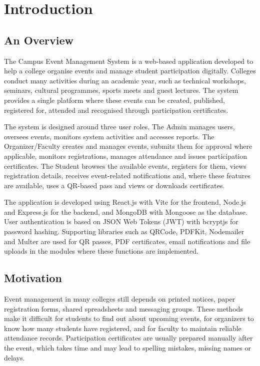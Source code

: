 \documentclass[12pt,a4paper]{report}
\begin{document}
\setcounter{page}{1}

\chapter{Introduction}

\section{An Overview}
The Campus Event Management System is a web-based application developed to help a college organise events and manage student participation digitally. Colleges conduct many activities during an academic year, such as technical workshops, seminars, cultural programmes, sports meets and guest lectures. The system provides a single platform where these events can be created, published, registered for, attended and recognised through participation certificates.

The system is designed around three user roles. The Admin manages users, oversees events, monitors system activities and accesses reports. The Organizer/Faculty creates and manages events, submits them for approval where applicable, monitors registrations, manages attendance and issues participation certificates. The Student browses the available events, registers for them, views registration details, receives event-related notifications and, where these features are available, uses a QR-based pass and views or downloads certificates.

The application is developed using React.js with Vite for the frontend, Node.js and Express.js for the backend, and MongoDB with Mongoose as the database. User authentication is based on JSON Web Tokens (JWT) with bcryptjs for password hashing. Supporting libraries such as QRCode, PDFKit, Nodemailer and Multer are used for QR passes, PDF certificates, email notifications and file uploads in the modules where these functions are implemented.

\section{Motivation}
Event management in many colleges still depends on printed notices, paper registration forms, shared spreadsheets and messaging groups. These methods make it difficult for students to find out about upcoming events, for organizers to know how many students have registered, and for faculty to maintain reliable attendance records. Participation certificates are usually prepared manually after the event, which takes time and may lead to spelling mistakes, missing names or delays.
\end{document}
